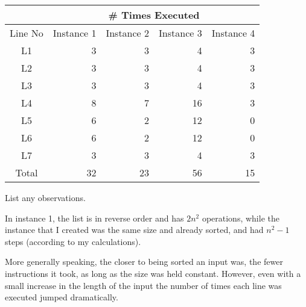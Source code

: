 \documentclass[12pt]{article}
\begin{document}
\vspace*{0.5in}
\begin{tabular}{|c|r|r|r|r|} \hline
            & \multicolumn{4}{c|}{\# Times Executed}                                        \\ \hline
    Line No & Instance 1                             & Instance 2 & Instance 3 & Instance 4 \\ \hline
    L1      & 3                                      & 3          & 4          & 3          \\ \hline
    L2      & 3                                      & 3          & 4          & 3          \\ \hline
    L3      & 3                                      & 3          & 4          & 3          \\ \hline
    L4      & 8                                      & 7          & 16         & 3          \\ \hline
    L5      & 6                                      & 2          & 12         & 0          \\ \hline
    L6      & 6                                      & 2          & 12         & 0          \\ \hline
    L7      & 3                                      & 3          & 4          & 3          \\ \hline
    Total   & 32                                     & 23         & 56         & 15         \\ \hline
\end{tabular}

\noindent
List any observations.

In instance 1, the list is in reverse order and has $2n^2$ operations, while the instance that I created was the same size and already sorted, and had $n^2 -1$ steps (according to my calculations).

More generally speaking, the closer to being sorted an input was, the fewer instructions it took, as long as the size was held constant. However, even with a small increase in the length of the input the number of times each line was executed jumped dramatically.
\end{document}

